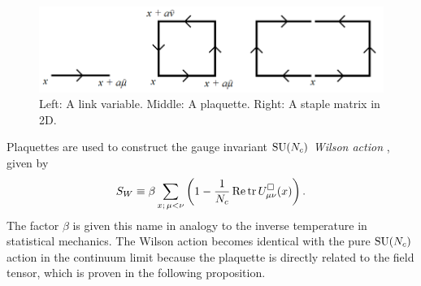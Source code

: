 \begin{figure}[t]
  \centering
  \includegraphics[width=0.9\linewidth]{figs/links.png}
  \caption{Left: A link variable. Middle: A plaquette. 
           Right: A staple matrix in 2D.}
  \label{fig:links}
\end{figure}

Plaquettes are used to construct the gauge invariant $\operatorname{SU}(N_c)$ {\it Wilson 
action} \cite{wilson_confinement_1974}, given by
\begin{equation}\label{eq:wilsonaction}\index{Wilson!action}
    S_W\equiv\beta\sum\limits_{x;\,\mu<\nu}\left(1
         -\frac{1}{N_c}\Re\tr \plaq_{\mu\nu}(x)\right).
\end{equation}
The factor $\beta$ is given this name in analogy to the inverse temperature 
in statistical mechanics. The Wilson action becomes identical with the
pure $\operatorname{SU}(N_c)$ action in the continuum limit because the plaquette is
directly related to the field tensor, which is proven in the following
proposition. 
\pagebreak
